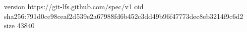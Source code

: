 version https://git-lfs.github.com/spec/v1
oid sha256:791d0ce98ceaf2d539e2a67988fd6b452c3dd49b96f47773dec8eb3214f9c6d2
size 43840
